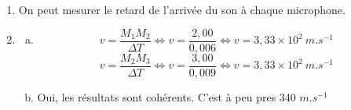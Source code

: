 \documentclass[12pt, a4paper]{article}
\begin{document}
    \begin{Exercise}[number={25}]
        \begin{enumerate}[1.]
            \item On peut mesurer le retard de l'arrivée du son à chaque microphone.
            \item   \begin{enumerate}[a.]
                        \item   \begin{equation*}
                                    v=\frac{M_1M_2}{\Delta T}
                                    \iff v=\frac{2{,}00}{0{,}006}
                                    \iff v=3{,}33\times 10^2\ m.s^{-1}
                                \end{equation*}
                                \begin{equation*}
                                    v=\frac{M_2M_3}{\Delta T}
                                    \iff v=\frac{3{,}00}{0{,}009}
                                    \iff v=3{,}33\times 10^2\ m.s^{-1}
                                \end{equation*}
                        \item Oui, les résultats sont cohérents. C'est à peu pres 340 $m.s^{-1}$
                    \end{enumerate}
        \end{enumerate}
    \end{Exercise}
\end{document}
